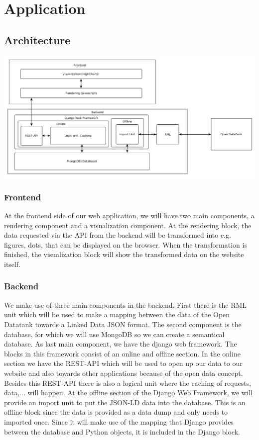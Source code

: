\chapter{Application}
\section{Architecture}
\includegraphics[width=16cm]{fig/Architecture}

\subsection{Frontend}
At the frontend side of our web application, we will have two main components, a rendering component and a visualization component. At the rendering block, the data requested via the API from the backend will be transformed into e.g. figures, dots, that can be displayed on the browser. When the transformation is finished, the visualization block will show the transformed data on the website itself.

\subsection{Backend}
We make use of three main components in the backend. First there is the RML unit which will be used to make a mapping between the data of the Open Datatank towards a Linked Data JSON format. The second component is the database, for which we will use MongoDB so we can create a semantical database. As last main component, we have the django web framework. The blocks in this framework consist of an online and offline section. In the online section we have the REST-API which will be used to open up our data to our website and also towards other applications because of the open data concept. Besides this REST-API there is also a logical unit where the caching of requests, data,... will happen. At the offline section of the Django Web Framework, we will provide an import unit to put the JSON-LD data into the database. This is an offline block since the data is provided as a data dump and only needs to imported once. Since it will make use of the mapping that Django provides between the database and Python objects, it is included in the Django block.

